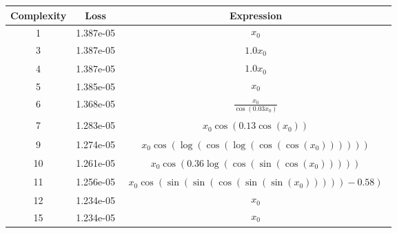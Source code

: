 \begin{center}
        \begin{tabular}{|c|c|c|}
        \hline
        Complexity & Loss & Expression \\
        \hline
        1 & 1.387e-05 & $\begin{aligned}x_{0}\end{aligned}$\\ \hline3 & 1.387e-05 & $\begin{aligned}1.0 x_{0}\end{aligned}$\\ \hline4 & 1.387e-05 & $\begin{aligned}1.0 x_{0}\end{aligned}$\\ \hline5 & 1.385e-05 & $\begin{aligned}x_{0}\end{aligned}$\\ \hline6 & 1.368e-05 & $\begin{aligned}\frac{x_{0}}{\cos{\left(0.03 x_{0} \right)}}\end{aligned}$\\ \hline7 & 1.283e-05 & $\begin{aligned}x_{0} \cos{\left(0.13 \cos{\left(x_{0} \right)} \right)}\end{aligned}$\\ \hline9 & 1.274e-05 & $\begin{aligned}x_{0} \cos{\left(\log{\left(\cos{\left(\log{\left(\cos{\left(\cos{\left(x_{0} \right)} \right)} \right)} \right)} \right)} \right)}\end{aligned}$\\ \hline10 & 1.261e-05 & $\begin{aligned}x_{0} \cos{\left(0.36 \log{\left(\cos{\left(\sin{\left(\cos{\left(x_{0} \right)} \right)} \right)} \right)} \right)}\end{aligned}$\\ \hline11 & 1.256e-05 & $\begin{aligned}x_{0} \cos{\left(\sin{\left(\sin{\left(\cos{\left(\sin{\left(\sin{\left(x_{0} \right)} \right)} \right)} \right)} \right)} - 0.58 \right)}\end{aligned}$\\ \hline12 & 1.234e-05 & $\begin{aligned}x_{0}\end{aligned}$\\ \hline15 & 1.234e-05 & $\begin{aligned}x_{0}\end{aligned}$\\ \hline\end{tabular}
        \end{center}
        